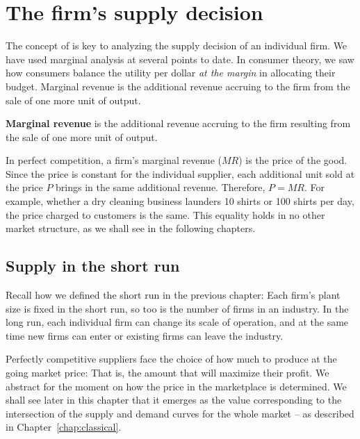 \section{The firm's supply decision}\label{sec:ch9sec3}

The concept of  is key to analyzing the supply
decision of an individual firm. We have used marginal analysis at several
points to date. In consumer theory, we saw how consumers balance the utility
per dollar \textit{at the margin} in allocating their budget. Marginal
revenue is the additional revenue accruing to the firm from the sale of one
more unit of output.

\begin{DefBox}
	\textbf{Marginal revenue} is the additional revenue accruing to the firm resulting from the sale of one more unit of output.
\end{DefBox}

In perfect competition, a firm's marginal revenue ($MR$) is the price of the
good. Since the price is constant for the individual supplier, each
additional unit sold at the price $P$ brings in the same additional revenue.
Therefore, $P=MR$. For example, whether a dry cleaning business launders 10
shirts or 100 shirts per day, the price charged to customers is the same.
This equality holds in no other market structure, as we shall see in the
following chapters.

\subsection*{Supply in the short run}

Recall how we defined the short run in the previous chapter: Each firm's
plant size is fixed in the short run, so too is the number of
firms in an industry. In the long run, each individual firm
can change its scale of operation, and at the same time new firms can enter
or existing firms can leave the industry.

Perfectly competitive suppliers face the choice of how much to produce at
the going market price: That is, the amount that will maximize their profit.
We abstract for the moment on how the price in the marketplace is
determined. We shall see later in this chapter that it emerges as the value
corresponding to the intersection of the supply and demand curves for the
whole market -- as described in Chapter~\ref{chap:classical}.

\newhtmlpage

